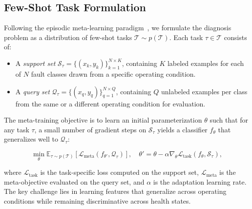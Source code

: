 \subsection{Few-Shot Task Formulation}

Following the episodic meta-learning paradigm~\cite{finn2017maml,snell2017prototypical}, we formulate the diagnosis problem as a distribution of few-shot tasks $\mathcal{T} \sim p(\mathcal{T})$. Each task $\tau \in \mathcal{T}$ consists of:

\begin{itemize}
    \item A \textit{support set} $\mathcal{S}_\tau = \{(x_k, y_k)\}_{k=1}^{N \times K}$, containing $K$ labeled examples for each of $N$ fault classes drawn from a specific operating condition.
    \item A \textit{query set} $\mathcal{Q}_\tau = \{(x_q, y_q)\}_{q=1}^{N \times Q}$, containing $Q$ unlabeled examples per class from the same or a different operating condition for evaluation.
\end{itemize}

The meta-training objective is to learn an initial parameterization $\theta$ such that for any task $\tau$, a small number of gradient steps on $\mathcal{S}_\tau$ yields a classifier $f_\theta$ that generalizes well to $\mathcal{Q}_\tau$:

\begin{equation}
\min_{\theta} \mathbb{E}_{\tau \sim p(\mathcal{T})} \left[ \mathcal{L}_{\text{meta}}(f_{\theta'}, \mathcal{Q}_\tau) \right],
\quad \theta' = \theta - \alpha \nabla_\theta \mathcal{L}_{\text{task}}(f_\theta, \mathcal{S}_\tau),
\label{eq:meta_objective}
\end{equation}

where $\mathcal{L}_{\text{task}}$ is the task-specific loss computed on the support set, $\mathcal{L}_{\text{meta}}$ is the meta-objective evaluated on the query set, and $\alpha$ is the adaptation learning rate. The key challenge lies in learning features that generalize across operating conditions while remaining discriminative across health states.
